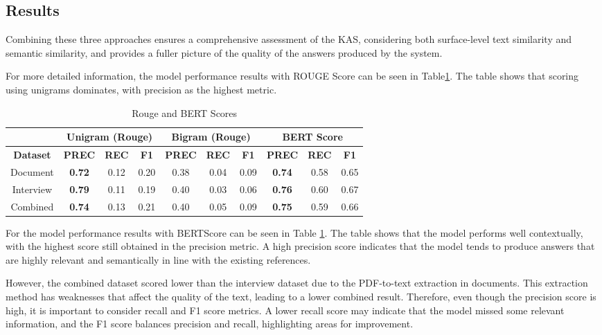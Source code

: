 \documentclass[runningheads]{llncs}
\begin{document}
\subsection{Results}
Combining these three approaches ensures a comprehensive assessment of the KAS, considering both surface-level text similarity and semantic similarity, and provides a fuller picture of the quality of the answers produced by the system.

For more detailed information, the model performance results with ROUGE Score can be seen in Table\ref{tab:rouge-bert-table}. The table shows that scoring using unigrams dominates, with precision as the highest metric.

\begin{table}[htbp]
    \centering
    \caption{Rouge and BERT Scores}
    \setlength{\arrayrulewidth}{0.5pt} %
    \renewcommand{\arraystretch}{1.5} %
    \begin{tabular}{|c|c|c|c|c|c|c|c|c|c|}
        \cline{2-10}
        \multicolumn{1}{c|}{} & \multicolumn{3}{c|}{\textbf{Unigram (Rouge)}} & \multicolumn{3}{c|}{\textbf{Bigram (Rouge)}} & \multicolumn{3}{c|}{\textbf{BERT Score}} \\ 
        \hline
        \textbf{Dataset} & \textbf{PREC} & \textbf{REC} & \textbf{F1} & \textbf{PREC} & \textbf{REC} & \textbf{F1} & \textbf{PREC} & \textbf{REC} & \textbf{F1} \\
        \hline
        Document & \textbf{0.72} & 0.12 & 0.20 & 0.38 & 0.04 & 0.09 & \textbf{0.74} & 0.58 & 0.65 \\ 
        \hline
        Interview & \textbf{0.79} & 0.11 & 0.19 & 0.40 & 0.03 & 0.06 & \textbf{0.76} & 0.60 & 0.67 \\ 
        \hline
        Combined & \textbf{0.74} & 0.13 & 0.21 & 0.40 & 0.05 & 0.09 & \textbf{0.75} & 0.59 & 0.66 \\ 
        \hline
    \end{tabular}
    \label{tab:rouge-bert-table}
\end{table}

For the model performance results with BERTScore can be seen in Table \ref{tab:rouge-bert-table}. The table shows that the model performs well contextually, with the highest score still obtained in the precision metric. A high precision score indicates that the model tends to produce answers that are highly relevant and semantically in line with the existing references.

However, the combined dataset scored lower than the interview dataset due to the PDF-to-text extraction in documents. This extraction method has weaknesses that affect the quality of the text, leading to a lower combined result. Therefore, even though the precision score is high, it is important to consider recall and F1 score metrics. A lower recall score may indicate that the model missed some relevant information, and the F1 score balances precision and recall, highlighting areas for improvement.
\end{document}

